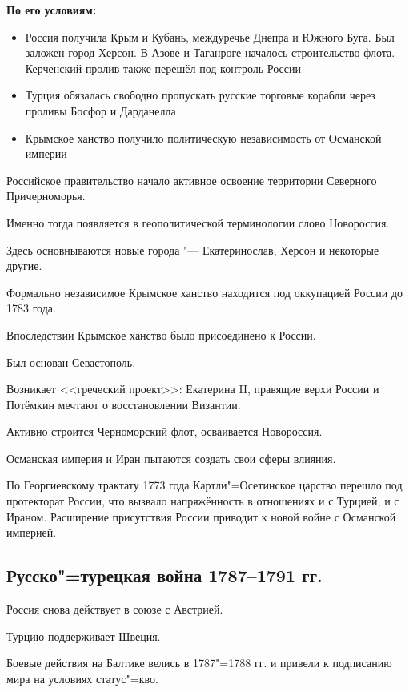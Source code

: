 \textbf{По его условиям:}

\begin{itemize}
    \item{ Россия получила Крым и Кубань, междуречье Днепра и Южного Буга. Был заложен город Херсон. В Азове и Таганроге началось строительство флота. Керченский пролив также перешёл под контроль России }
    \item{ Турция обязалась свободно пропускать русские торговые корабли через проливы Босфор и Дарданелла }
    \item{ Крымское ханство получило политическую независимость от Османской империи }
\end{itemize}



Российское правительство начало активное освоение территории Северного Причерноморья. 

Именно тогда появляется в геополитической терминологии слово Новороссия. 

Здесь основнываются новые города "--- Екатеринослав, Херсон и некоторые другие.

Формально независимое Крымское ханство находится под оккупацией России до 1783 года.

Впоследствии Крымское ханство было присоединено к России. 

Был основан Севастополь.

Возникает <<греческий проект>>: Екатерина II, правящие верхи России и Потёмкин мечтают о восстановлении Византии. 

Активно строится Черноморский флот, осваивается Новороссия.

Османская империя и Иран пытаются создать свои сферы влияния.

По Георгиевскому трактату 1773 года Картли"=Осетинское царство перешло под протекторат России, что вызвало напряжённость в отношениях и с Турцией, и с Ираном. Расширение присутствия России приводит к новой войне с Османской империей.

\subsection{Русско"=турецкая война 1787--1791 гг.}

Россия снова действует в союзе с Австрией. 

Турцию поддерживает Швеция.

Боевые действия на Балтике велись в 1787"=1788 гг. и привели к подписанию мира на условиях статус"=кво.

